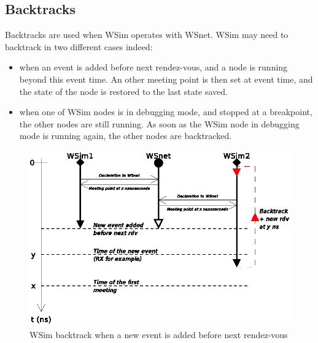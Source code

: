 \documentclass[a4paper,10pt]{report}
\begin{document}
\subsection{Backtracks}
Backtracks are used when WSim operates with WSnet. WSim may need to backtrack in two different cases indeed:
\begin{itemize}
  \item when an event is added before next rendez-vous, and a node is running beyond this event time. An other meeting point is then set at event time, and the state of the node is restored to the last state saved.
  \item when one of WSim nodes is in debugging mode, and stopped at a breakpoint, the other nodes are still running. As soon as the WSim node in debugging mode is running again, the other nodes are backtracked.
\end{itemize}

\begin{figure}
\begin{center}
  \includegraphics[scale=1]{figures/wsim_backtrack1.eps}
\end{center}
\caption{WSim backtrack when a new event is added before next rendez-vous}
\label{wsim backtrack 1}
\end{figure}
\end{document}
